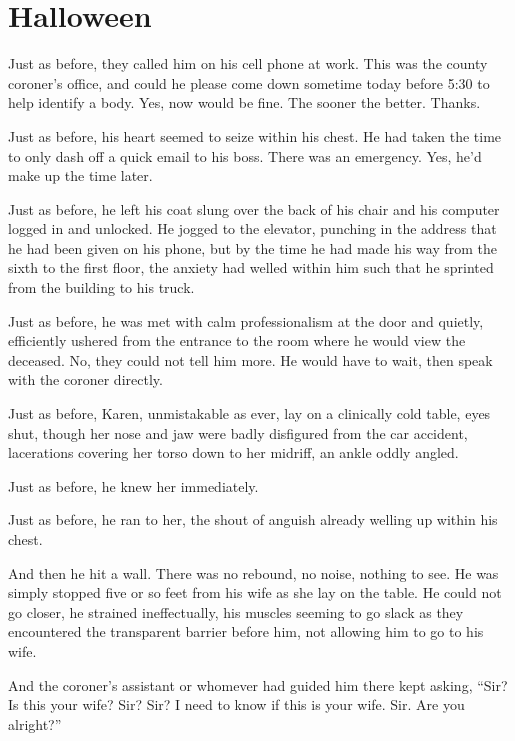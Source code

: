 \chapter{Halloween}

\begin{itshape}
  Just as before, they called him on his cell phone at work.  This was the county coroner's office, and could he please come down sometime today before 5:30 to help identify a body.  Yes, now would be fine.  The sooner the better.  Thanks.

  Just as before, his heart seemed to seize within his chest.  He had taken the time to only dash off a quick email to his boss.  There was an emergency.  Yes, he'd make up the time later.

  Just as before, he left his coat slung over the back of his chair and his computer logged in and unlocked.  He jogged to the elevator, punching in the address that he had been given on his phone, but by the time he had made his way from the sixth to the first floor, the anxiety had welled within him such that he sprinted from the building to his truck.

  Just as before, he was met with calm professionalism at the door and quietly, efficiently ushered from the entrance to the room where he would view the deceased.  No, they could not tell him more.  He would have to wait, then speak with the coroner directly.

  Just as before, Karen, unmistakable as ever, lay on a clinically cold table, eyes shut, though her nose and jaw were badly disfigured from the car accident, lacerations covering her torso down to her midriff, an ankle oddly angled.

  Just as before, he knew her immediately.

  Just as before, he ran to her, the shout of anguish already welling up within his chest.

  And then he hit a wall.  There was no rebound, no noise, nothing to see.  He was simply stopped five or so feet from his wife as she lay on the table.  He could not go closer, he strained ineffectually, his muscles seeming to go slack as they encountered the transparent barrier before him, not allowing him to go to his wife.

  And the coroner's assistant or whomever had guided him there kept asking, ``Sir?  Is this your wife?  Sir?  Sir?  I need to know if this is your wife.  Sir.  Are you alright?''
\end{itshape}

